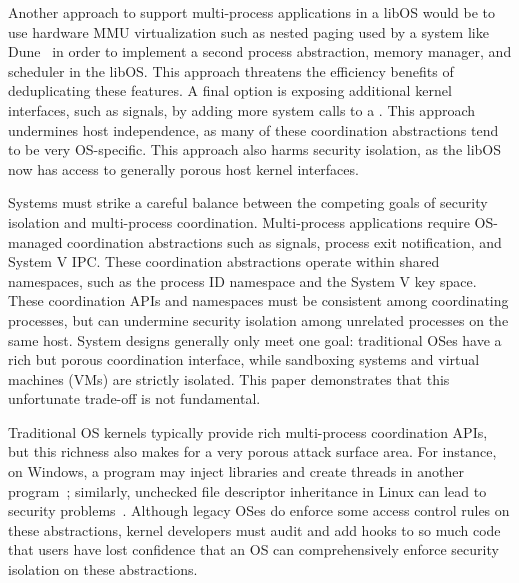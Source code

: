 \vspace{5pt}
Another approach to support multi-process applications in a libOS 
would be to use hardware MMU virtualization such as nested paging
used by a system like Dune~\citep{belay12dune}
in order to implement a second process abstraction, memory manager, and scheduler in the libOS.
This approach threatens the efficiency benefits of deduplicating these features.
A final option is exposing additional kernel interfaces, such as signals, 
by adding more system calls to a \picoproc{}.
This approach undermines host independence, as many of these coordination abstractions 
tend to be very OS-specific.
This approach also harms security isolation, as the libOS now has access to generally 
porous host kernel interfaces.  


Systems must strike a careful balance between the competing goals of
security isolation and
multi-process coordination.
Multi-process applications require OS-managed coordination abstractions
such as signals, process exit notification, and System V IPC.
These coordination abstractions operate within shared namespaces, such as the 
process ID namespace
and the System V key space.
These coordination APIs and namespaces must be consistent among coordinating processes,
but can %
undermine security isolation among unrelated processes on the same host.
System designs generally only meet one goal: 
traditional OSes have a rich but porous coordination interface, 
while sandboxing systems and virtual machines (VMs) 
are strictly isolated.
This paper demonstrates that this unfortunate trade-off is not
fundamental.


Traditional OS kernels typically provide  rich multi-process coordination 
APIs, but this richness also makes for a very porous attack surface
area.  For instance, on Windows, a program may inject libraries and
create threads in another program~\citep{windows-dll-inject}; 
similarly, unchecked file descriptor inheritance in Linux can lead to
security problems~\citep{close-on-exec}.  
Although legacy OSes do enforce some access control rules on these abstractions,
kernel developers must audit and add hooks to so much code
that
users have lost confidence that an OS can comprehensively enforce 
security isolation on these abstractions.

